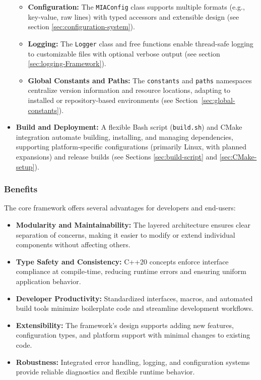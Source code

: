 \begin{itemize}
\begin{itemize}
		\item \textbf{Configuration:} The \texttt{MIAConfig} class supports multiple formats (e.g., key-value, raw lines) with typed accessors and extensible design (see section \ref{sec:configuration-system}).
		\item \textbf{Logging:} The \texttt{Logger} class and free functions enable thread-safe logging to customizable files with optional verbose output (see section \ref{sec:logging-Framework}).
		\item \textbf{Global Constants and Paths:} The \texttt{constants} and \texttt{paths} namespaces centralize version information and resource locations, adapting to installed or repository-based environments (see Section~\ref{sec:global-constants}).
	\end{itemize}
	\item \textbf{Build and Deployment:} A flexible Bash script (\texttt{build.sh}) and CMake integration automate building, installing, and managing dependencies, supporting platform-specific configurations (primarily Linux, with planned expansions) and release builds (see Sections \ref{sec:build-script} and \ref{sec:CMake-setup}).
\end{itemize}

\subsubsection{Benefits}
The core framework offers several advantages for developers and end-users:
\begin{itemize}\itemsep0em
	\item \textbf{Modularity and Maintainability:} The layered architecture ensures clear separation of concerns, making it easier to modify or extend individual components without affecting others.
	\item \textbf{Type Safety and Consistency:} C++20 concepts enforce interface compliance at compile-time, reducing runtime errors and ensuring uniform application behavior.
	\item \textbf{Developer Productivity:} Standardized interfaces, macros, and automated build tools minimize boilerplate code and streamline development workflows.
	\item \textbf{Extensibility:} The framework's design supports adding new features, configuration types, and platform support with minimal changes to existing code.
	\item \textbf{Robustness:} Integrated error handling, logging, and configuration systems provide reliable diagnostics and flexible runtime behavior.
\end{itemize}

